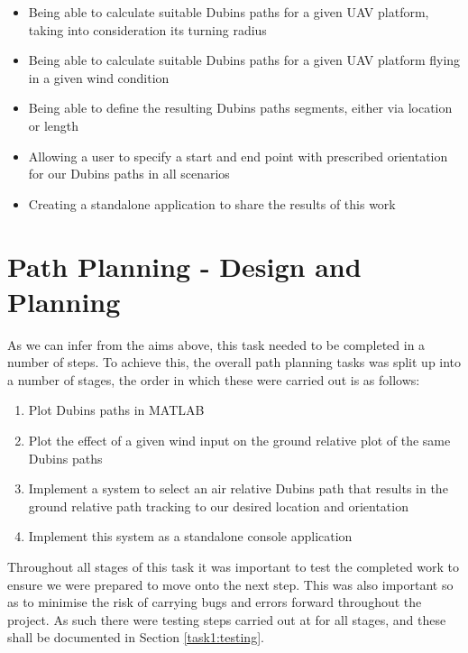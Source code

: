 \begin{itemize}
	\item Being able to calculate suitable Dubins paths for a given UAV platform, taking into consideration its turning radius
	\item Being able to calculate suitable Dubins paths for a given UAV platform flying in a given wind condition
	\item Being able to define the resulting Dubins paths segments, either via location or length
	\item Allowing a user to specify a start and end point with prescribed orientation for our Dubins paths in all scenarios
	\item Creating a standalone application to share the results of this work
\end{itemize}

\section{Path Planning - Design and Planning}
\label{task1:design}

As we can infer from the aims above, this task needed to be completed in a number of steps. To achieve this, the overall path planning tasks was split up into a number of stages, the order in which these were carried out is as follows:

\begin{enumerate}
	\item Plot Dubins paths in MATLAB
	\item Plot the effect of a given wind input on the ground relative plot of the same Dubins paths
	\item Implement a system to select an air relative Dubins path that results in the ground relative path tracking to our desired location and orientation
	\item Implement this system as a standalone console application
\end{enumerate}

Throughout all stages of this task it was important to test the completed work to ensure we were prepared to move onto the next step. This was also important so as to minimise the risk of carrying bugs and errors forward throughout the project. As such there were testing steps carried out at for all stages, and these shall be documented in Section \ref{task1:testing}. 

